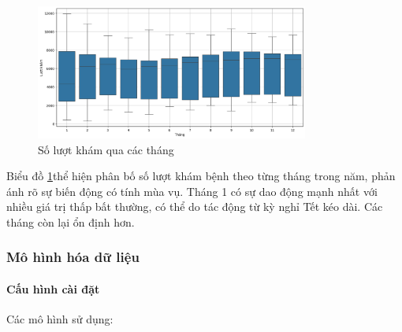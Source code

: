     \begin{figure}[htp]
        \centering
        \includegraphics[width=0.80\textwidth]{images/TS_yte_tong_box_month.png}
        \caption{Số lượt khám qua các tháng}
        \label{fig:TS_yte_tong_box_month}
    \end{figure}
    \FloatBarrier

    Biểu đồ \ref{fig:TS_yte_tong_box_month}thể hiện phân bố số lượt khám bệnh theo từng tháng trong năm, phản ánh rõ sự biến động có tính mùa vụ. Tháng 1 có sự dao động mạnh nhất với nhiều giá trị thấp bất thường, có thể do tác động từ kỳ nghỉ Tết kéo dài. Các tháng còn lại ổn định hơn.

\subsubsection{Mô hình hóa dữ liệu}
    \paragraph{Cấu hình cài đặt} 
    \leavevmode

    Các mô hình sử dụng:

